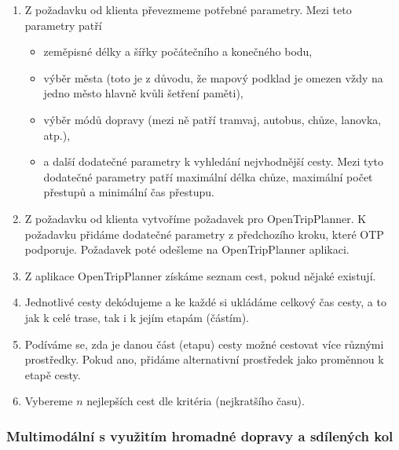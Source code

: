 \documentclass[thesis=M,czech]{FITthesis}[2019/12/23]
\theoremstyle{plain}
\theoremstyle{definition}
\begin{document}
\begin{enumerate}
	\item Z požadavku od klienta převezmeme potřebné parametry. Mezi teto parametry patří
	\begin{itemize}
		\item zeměpisné délky a šířky počátečního a konečného bodu,
		\item výběr města (toto je z důvodu, že mapový podklad je omezen vždy na jedno město hlavně kvůli šetření paměti),
		\item výběr módů dopravy (mezi ně patří tramvaj, autobus, chůze, lanovka, atp.),
		\item a další dodatečné parametry k vyhledání nejvhodnější cesty. Mezi tyto dodatečné parametry patří maximální délka chůze, maximální počet přestupů a  minimální čas přestupu.
	\end{itemize}
   

	\item Z požadavku od klienta vytvoříme požadavek pro OpenTripPlanner. K požadavku přidáme dodatečné parametry z předchozího kroku, které OTP podporuje. Požadavek poté odešleme na OpenTripPlanner aplikaci. 
	\item Z aplikace OpenTripPlanner získáme seznam cest, pokud nějaké existují. 
	\item Jednotlivé cesty dekódujeme a ke každé si ukládáme celkový čas cesty, a to jak k celé trase, tak i k jejím etapám (částím). 
	\item Podíváme se, zda je danou část (etapu) cesty možné cestovat více různými prostředky. Pokud ano, přidáme alternativní prostředek jako proměnnou k etapě cesty.
	\item Vybereme $n$ nejlepších cest dle kritéria (nejkratšího času).
\end{enumerate}







\subsubsection{Multimodální s využitím hromadné dopravy a sdílených kol}
\end{document}
